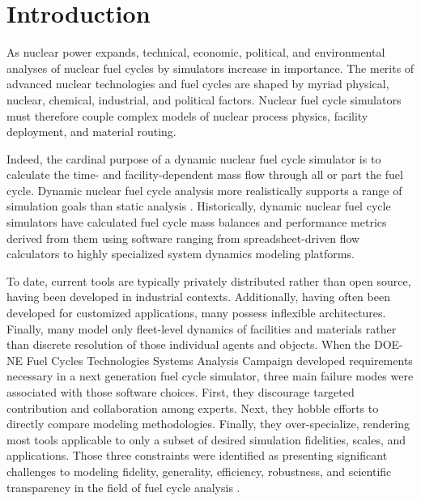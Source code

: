 
\section{Introduction}



As nuclear power expands, technical, economic, political, and environmental
analyses of nuclear fuel cycles by simulators increase in importance. The
merits of advanced nuclear technologies and fuel cycles are
shaped by myriad physical, nuclear, chemical, industrial, and political
factors. Nuclear fuel cycle simulators must therefore couple complex models of
nuclear process physics, facility deployment, and material routing.

Indeed, the cardinal purpose of a dynamic nuclear fuel cycle simulator is to calculate
the time- and facility-dependent mass flow through all or part the fuel cycle.
Dynamic nuclear fuel cycle analysis more realistically supports a range of
simulation goals than static analysis \cite{piet_dynamic_2011}. Historically,
dynamic nuclear fuel cycle simulators have calculated fuel cycle mass balances
and performance metrics derived from them using software ranging from
spreadsheet-driven flow calculators to highly specialized system dynamics
modeling platforms.

To date, current tools are typically privately distributed rather than open
source, having been developed in industrial contexts. Additionally, having
often been developed for customized applications, many possess inflexible
architectures. Finally, many model only fleet-level dynamics of facilities and
materials rather than discrete resolution of those individual agents and
objects. When the DOE-NE Fuel Cycles Technologies Systems Analysis Campaign
developed requirements necessary in a next generation fuel cycle simulator,
three main failure modes were associated with those software choices.
First, they discourage targeted
contribution and collaboration among experts. Next, they hobble efforts to
directly compare modeling methodologies. Finally, they over-specialize,
rendering most tools applicable to only a subset of desired simulation
fidelities, scales, and applications. Those three constraints were identified
as presenting significant challenges to modeling fidelity, generality, efficiency,
robustness, and scientific transparency in the field of fuel cycle analysis
\cite{huff_next_2010}.

